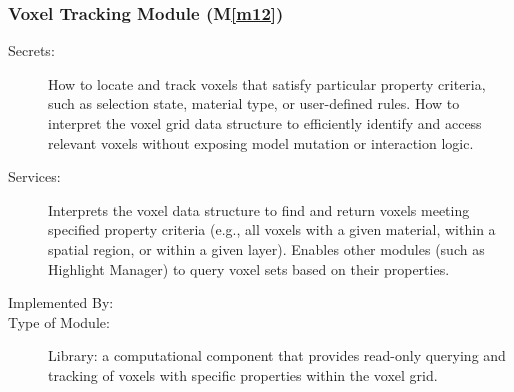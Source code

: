 \documentclass[12pt, titlepage]{article}
\newcommand{\mref}[1]{M\ref{#1}}
\begin{document}
\fi

\subsubsection{Voxel Tracking Module (\mref{m12})}


\begin{description}
  \item[Secrets:] How to locate and track voxels that satisfy particular property criteria, such as selection state, material type, or user-defined rules. How to interpret the voxel grid data structure to efficiently identify and access relevant voxels without exposing model mutation or interaction logic.
  \item[Services:] Interprets the voxel data structure to find and return voxels meeting specified property criteria (e.g., all voxels with a given material, within a spatial region, or within a given layer). Enables other modules (such as Highlight Manager) to query voxel sets based on their properties.
  \item[Implemented By:] \progname{}
  \item[Type of Module:] Library: a computational component that provides read-only querying and tracking of voxels with specific properties within the voxel grid.
\end{description}
\end{document}
